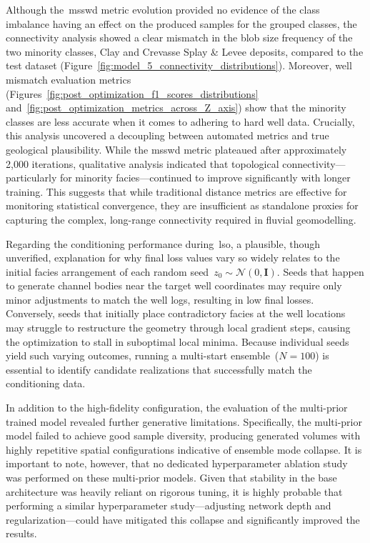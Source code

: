Although the~\gls{msswd} metric evolution provided no evidence of the class imbalance having an effect on the produced samples for the grouped classes, the connectivity analysis showed a clear mismatch in the blob size frequency of the two minority classes, Clay and Crevasse Splay \& Levee deposits, compared to the test dataset (Figure~\ref{fig:model_5_connectivity_distributions}). Moreover, well mismatch evaluation metrics (Figures~\ref{fig:post_optimization_f1_scores_distributions} and~\ref{fig:post_optimization_metrics_across_Z_axis}) show that the minority classes are less accurate when it comes to adhering to hard well data. Crucially, this analysis uncovered a decoupling between automated metrics and true geological plausibility. While the \gls{msswd} metric plateaued after approximately 2,000 iterations, qualitative analysis indicated that topological connectivity—particularly for minority facies—continued to improve significantly with longer training. This suggests that while traditional distance metrics are effective for monitoring statistical convergence, they are insufficient as standalone proxies for capturing the complex, long-range connectivity required in fluvial geomodelling.

Regarding the conditioning performance during~\gls{lso}, a plausible, though unverified, explanation for why final loss values vary so widely relates to the initial facies arrangement of each random seed~$z_0 \sim \mathcal{N}(0, \mathbf{I})$. Seeds that happen to generate channel bodies near the target well coordinates may require only minor adjustments to match the well logs, resulting in low final losses. Conversely, seeds that initially place contradictory facies at the well locations may struggle to restructure the geometry through local gradient steps, causing the optimization to stall in suboptimal local minima. Because individual seeds yield such varying outcomes, running a multi-start ensemble~($N = 100$) is essential to identify candidate realizations that successfully match the conditioning data.

In addition to the high-fidelity configuration, the evaluation of the multi-prior trained model revealed further generative limitations. Specifically, the multi-prior model failed to achieve good sample diversity, producing generated volumes with highly repetitive spatial configurations indicative of ensemble mode collapse. It is important to note, however, that no dedicated hyperparameter ablation study was performed on these multi-prior models. Given that stability in the base architecture was heavily reliant on rigorous tuning, it is highly probable that performing a similar hyperparameter study—adjusting network depth and regularization—could have mitigated this collapse and significantly improved the results.

